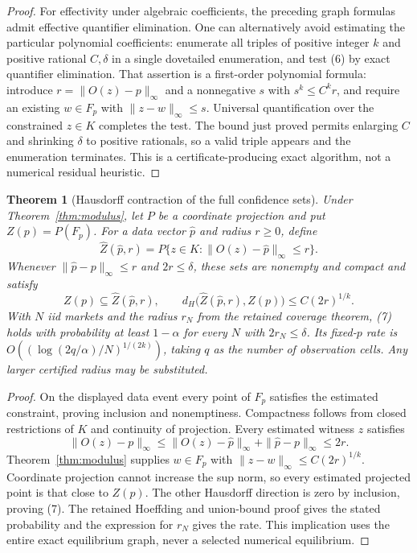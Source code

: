 \documentclass[11pt]{article}
\newtheorem{theorem}{Theorem}
\theoremstyle{remark}\newtheorem{remark}[theorem]{Remark}
\begin{document}
\begin{proof}
For effectivity under algebraic coefficients, the preceding graph
formulas admit effective quantifier elimination. One can alternatively
avoid estimating the particular polynomial coefficients: enumerate all
triples of positive integer $k$ and positive rational $C,\delta$ in a
single dovetailed enumeration, and test (6) by exact quantifier
elimination. That assertion is a first-order polynomial formula: introduce
$r=\|O(z)-p\|_\infty$ and a nonnegative $s$ with
$s^k\leq C^k r$, and require an existing $w\in F_p$ with
$\|z-w\|_\infty\leq s$. Universal quantification over the constrained
$z\in K$ completes the test. The bound just proved permits enlarging $C$
and shrinking $\delta$ to positive rationals, so a valid triple appears
and the enumeration terminates. This is a certificate-producing exact
algorithm, not a numerical residual heuristic.
\end{proof}

\begin{theorem}[Hausdorff contraction of the full confidence sets]
\label{thm:hausdorff}
Under Theorem~\ref{thm:modulus}, let $P$ be a coordinate projection and
put $Z(p)=P(F_p)$. For a data vector $\widehat p$ and radius $r\geq0$,
define
\[
 \widehat Z(\widehat p,r)
 =P\{z\in K:\|O(z)-\widehat p\|_\infty\leq r\}.
\]
Whenever $\|\widehat p-p\|_\infty\leq r$ and $2r\leq\delta$,
these sets are nonempty and compact and satisfy
\[
 Z(p)\subseteq\widehat Z(\widehat p,r),\qquad
 d_H\bigl(\widehat Z(\widehat p,r),Z(p)\bigr)
                         \leq C(2r)^{1/k}.            \tag{7}
\]
With $N$ iid markets and the radius $r_N$ from the retained coverage
theorem, (7) holds with probability at least $1-\alpha$ for every $N$
with $2r_N\leq\delta$. Its fixed-$p$ rate is
$O((\log(2q/\alpha)/N)^{1/(2k)})$, taking $q$ as the number of observation
cells. Any larger certified radius may be substituted.
\end{theorem}
\begin{proof}
On the displayed data event every point of $F_p$ satisfies the estimated
constraint, proving inclusion and nonemptiness. Compactness follows from
closed restrictions of $K$ and continuity of projection. Every estimated
witness $z$ satisfies
\[
 \|O(z)-p\|_\infty
 \leq\|O(z)-\widehat p\|_\infty+\|\widehat p-p\|_\infty
 \leq2r.
\]
Theorem~\ref{thm:modulus} supplies $w\in F_p$ with
$\|z-w\|_\infty\leq C(2r)^{1/k}$. Coordinate projection cannot increase
the sup norm, so every estimated projected point is that close to $Z(p)$.
The other Hausdorff direction is zero by inclusion, proving (7).
The retained Hoeffding and union-bound proof gives the stated probability
and the expression for $r_N$ gives the rate. This implication uses the
entire exact equilibrium graph, never a selected numerical equilibrium.
\end{proof}
\end{document}
